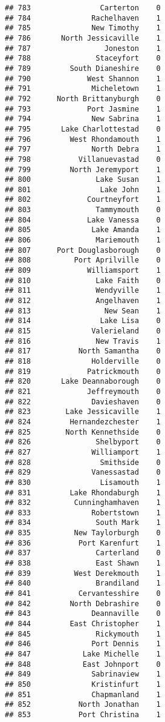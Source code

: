 \documentclass[
]{article}
\begin{document}
\begin{verbatim}
## 783                Carterton    0
## 784              Rachelhaven    1
## 785              New Timothy    1
## 786       North Jessicaville    1
## 787                 Joneston    1
## 788               Staceyfort    0
## 789         South Dianeshire    0
## 790             West Shannon    1
## 791              Micheletown    1
## 792      North Brittanyburgh    0
## 793             Port Jasmine    1
## 794              New Sabrina    1
## 795       Lake Charlottestad    0
## 796         West Rhondamouth    1
## 797              North Debra    1
## 798           Villanuevastad    0
## 799         North Jeremyport    1
## 800               Lake Susan    1
## 801                Lake John    1
## 802             Courtneyfort    1
## 803               Tammymouth    0
## 804             Lake Vanessa    0
## 805              Lake Amanda    1
## 806               Mariemouth    1
## 807      Port Douglasborough    0
## 808          Port Aprilville    0
## 809             Williamsport    1
## 810               Lake Faith    0
## 811               Wendyville    1
## 812               Angelhaven    1
## 813                 New Sean    1
## 814                Lake Lisa    0
## 815              Valerieland    0
## 816               New Travis    1
## 817           North Samantha    0
## 818              Holderville    0
## 819             Patrickmouth    0
## 820       Lake Deannaborough    0
## 821             Jeffreymouth    0
## 822              Davieshaven    0
## 823        Lake Jessicaville    1
## 824         Hernandezchester    1
## 825        North Kennethside    0
## 826               Shelbyport    0
## 827              Williamport    1
## 828                Smithside    0
## 829              Vanessastad    0
## 830                Lisamouth    1
## 831         Lake Rhondaburgh    1
## 832          Cunninghamhaven    1
## 833              Robertstown    1
## 834               South Mark    1
## 835          New Taylorburgh    0
## 836           Port Karenfurt    1
## 837               Carterland    0
## 838               East Shawn    1
## 839          West Derekmouth    1
## 840               Brandiland    1
## 841           Cervantesshire    0
## 842         North Debrashire    0
## 843              Deannaville    0
## 844         East Christopher    1
## 845               Rickymouth    1
## 846              Port Dennis    1
## 847            Lake Michelle    1
## 848            East Johnport    0
## 849              Sabrinaview    1
## 850              Kristinfurt    1
## 851              Chapmanland    1
## 852           North Jonathan    1
## 853           Port Christina    1

\end{verbatim}
\end{document}
